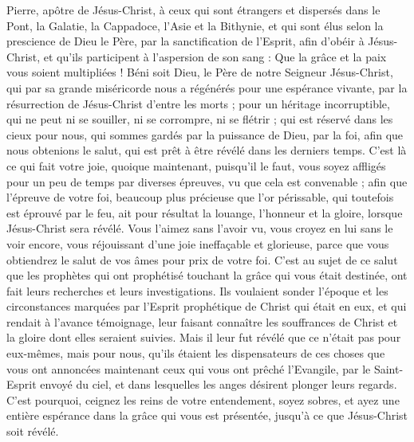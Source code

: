 \BFont
\begin{multicols}{2}
\TextTitle{[Introduction]}
\VerseOne{}Pierre, apôtre de Jésus-Christ, à ceux qui sont étrangers et dispersés dans le Pont{}, la Galatie, la Cappadoce, l’Asie et la Bithynie,
et qui sont élus selon la prescience de Dieu le Père, par la sanctification de l’Esprit, afin d’obéir à Jésus-Christ, et qu’ils participent à l'aspersion de son sang : Que la grâce et la paix vous soient multipliées !
Béni soit Dieu, le Père de notre Seigneur Jésus-Christ, qui par sa grande miséricorde nous a régénérés pour une espérance vivante, par la résurrection de Jésus-Christ d'entre les morts ;
pour un héritage incorruptible, qui ne peut ni se souiller, ni se corrompre, ni se flétrir ; qui est réservé dans les cieux pour nous,
qui sommes gardés par la puissance de Dieu, par la foi, afin que nous obtenions le salut, qui est prêt à être révélé dans les derniers temps.
C’est là ce qui fait votre joie, quoique maintenant, puisqu’il le faut, vous soyez affligés pour un peu de temps par diverses épreuves, vu que cela est convenable ;
afin que l'épreuve de votre foi, beaucoup plus précieuse que l'or périssable, qui toutefois est éprouvé par le feu, ait pour résultat la louange, l’honneur et la gloire, lorsque Jésus-Christ sera révélé.
Vous l’aimez sans l’avoir vu, vous croyez en lui sans le voir encore, vous réjouissant d’une joie ineffaçable et glorieuse,
parce que vous obtiendrez le salut de vos âmes pour prix de votre foi.
C’est au sujet de ce salut que les prophètes qui ont prophétisé touchant la grâce qui vous était destinée, ont fait leurs recherches et leurs investigations.
Ils voulaient sonder l’époque et les circonstances marquées par l'Esprit prophétique de Christ qui était en eux, et qui rendait à l’avance témoignage, leur faisant connaître les souffrances de Christ et la gloire dont elles seraient suivies.
Mais il leur fut révélé que ce n'était pas pour eux-mêmes, mais pour nous, qu'ils étaient les dispensateurs de ces choses que vous ont annoncées maintenant ceux qui vous ont prêché l'Evangile, par le Saint-Esprit envoyé du ciel, et dans lesquelles les anges désirent plonger leurs regards.
C’est pourquoi, ceignez les reins de votre entendement, soyez sobres, et ayez une entière espérance dans la grâce qui vous est présentée, jusqu'à ce que Jésus-Christ soit révélé{}.

\end{multicols}
